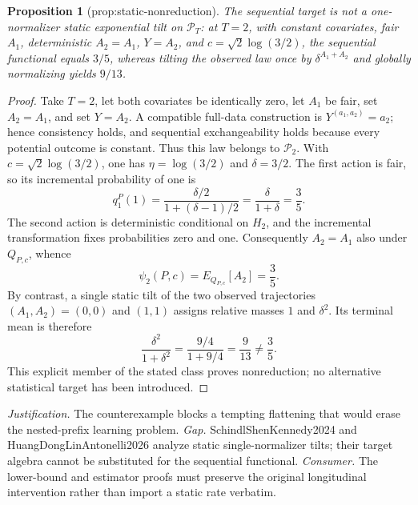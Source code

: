 \documentclass{article}
\newtheorem{proposition}{Proposition}
\begin{document}
\begin{proposition}[prop:static-nonreduction]\label{prop:static-nonreduction}
The sequential target is not a one-normalizer static exponential tilt on \(\mathcal P_T\): at \(T=2\), with constant covariates, fair \(A_1\), deterministic \(A_2=A_1\), \(Y=A_2\), and \(c=\sqrt2\log(3/2)\), the sequential functional equals \(3/5\), whereas tilting the observed law once by \(\delta^{A_1+A_2}\) and globally normalizing yields \(9/13\).
\end{proposition}
\begin{proof}
Take \(T=2\), let both covariates be identically zero, let \(A_1\) be fair, set \(A_2=A_1\), and set \(Y=A_2\).  A compatible full-data construction is \(Y^{(a_1,a_2)}=a_2\); hence consistency holds, and sequential exchangeability holds because every potential outcome is constant.  Thus this law belongs to \(\mathcal P_2\).  With \(c=\sqrt2\log(3/2)\), one has \(\eta=\log(3/2)\) and \(\delta=3/2\).  The first action is fair, so its incremental probability of one is
\[
 q_1^P(1)=\frac{\delta/2}{1+(\delta-1)/2}=\frac{\delta}{1+\delta}=\frac35.
\]
The second action is deterministic conditional on \(H_2\), and the incremental transformation fixes probabilities zero and one.  Consequently \(A_2=A_1\) also under \(Q_{P,c}\), whence
\[
 \psi_2(P,c)=E_{Q_{P,c}}[A_2]=\frac35.
\]
By contrast, a single static tilt of the two observed trajectories \((A_1,A_2)=(0,0)\) and \((1,1)\) assigns relative masses \(1\) and \(\delta^2\).  Its terminal mean is therefore
\[
 \frac{\delta^2}{1+\delta^2}=\frac{9/4}{1+9/4}=\frac9{13}\neq\frac35.
\]
This explicit member of the stated class proves nonreduction; no alternative statistical target has been introduced.
\end{proof}
\par\smallskip\noindent \textit{Justification.} The counterexample blocks a tempting flattening that would erase the nested-prefix learning problem. \textit{Gap.} SchindlShenKennedy2024 and HuangDongLinAntonelli2026 analyze static single-normalizer tilts; their target algebra cannot be substituted for the sequential functional. \textit{Consumer.} The lower-bound and estimator proofs must preserve the original longitudinal intervention rather than import a static rate verbatim.
\end{document}
